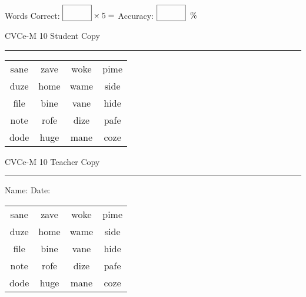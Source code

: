 \documentclass{memoir}
\begin{document}
\small

Words Correct: $\fbox{\phantom{\huge 100}} \times 5 = $ Accuracy: $\fbox{\phantom{\huge 100}}\;\; \%$ 

\vfill

\newpage


\footnotesize \noindent
CVCe-M 10 \hfill Student Copy
\smallskip
\hrule

\Large

\setlength{\tabcolsep}{14pt}
\def\arraystretch{2}

{\selectfont


\begin{vplace}[0.5]
\begin{center}
\begin{tabular}{cccc}
sane & zave & woke & pime \\
duze & home & wame & side \\
file & bine & vane & hide \\
note & rofe & dize & pafe \\
dode & huge & mane & coze \\
\end{tabular}
\end{center}
\end{vplace}

}

\newpage

\footnotesize \noindent
CVCe-M 10 \hfill Teacher Copy
\smallskip
\hrule

\small

\vfill

\noindent
Name: \underline{\hspace{1.75in}} \hfill Date: \underline{\hspace{1in}}

\Large

{\selectfont


\begin{vplace}[0.5]
\begin{center}
\begin{tabular}{cccc}
sane & zave & woke & pime \\
duze & home & wame & side \\
file & bine & vane & hide \\
note & rofe & dize & pafe \\
dode & huge & mane & coze \\
\end{tabular}
\end{center}
\end{vplace}



}
\end{document}
